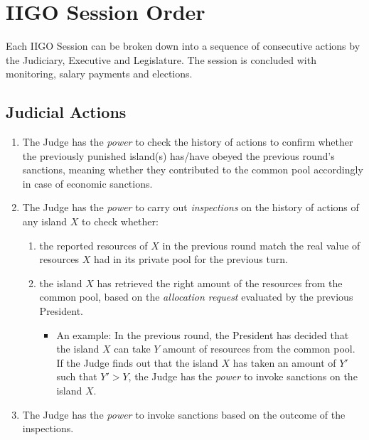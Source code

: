 \section{IIGO Session Order}
Each IIGO Session can be broken down into a sequence of consecutive actions by the Judiciary, Executive and Legislature. The session is concluded with monitoring, salary payments and elections.
\subsection{Judicial Actions}
\begin{enumerate}
    \item The Judge has the \emph{power} to check the history of actions to confirm whether the previously punished island(s) has/have obeyed the previous round's sanctions, meaning whether they contributed to the common pool accordingly in case of economic sanctions.
    \item The Judge has the \emph{power} to carry out \emph{inspections} on the history of actions of any island $X$ to check whether:
        \begin{enumerate}
        \item the reported resources of $X$ in the previous round match the real value of resources $X$ had in its private pool for the previous turn.
        \item the island $X$ has retrieved the right amount of the resources from the common pool, based on the \emph{allocation request} evaluated by the previous President.
            \begin{itemize}
            \item An example: In the previous round, the President has decided that the island $X$ can take $Y$ amount of resources from the common pool. If the Judge finds out that the island $X$ has taken an amount of $Y'$ such that $Y' > Y$, the Judge has the \emph{power} to invoke sanctions on the island $X$.
            
            \end{itemize}
        \end{enumerate}
    \item The Judge has the \emph{power} to invoke sanctions based on the outcome of the inspections.
\end{enumerate}
